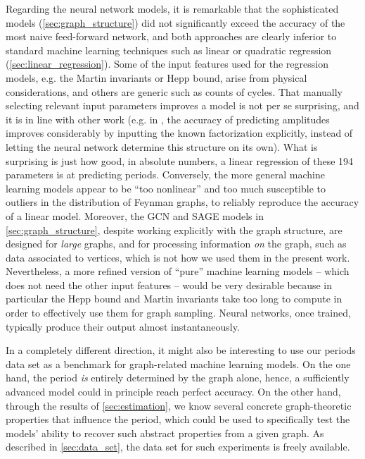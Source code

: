 \documentclass[11pt]{scrartcl}
\numberwithin{equation}{section}
\begin{document}
Regarding the neural network models, it is remarkable that the sophisticated  models (\cref{sec:graph_structure})  did not significantly exceed the accuracy of the most naive feed-forward network, and both approaches are clearly inferior to standard machine learning techniques such as linear or quadratic regression (\cref{sec:linear_regression}). Some of the input features used for the regression models, e.g. the Martin invariants or Hepp bound, arise from physical considerations, and others are generic such as counts of cycles. 
That manually selecting relevant input parameters improves a model is not per se surprising, and it is in line with other work (e.g. in \cite{maitre_oneloop_2023}, the accuracy of predicting amplitudes improves considerably by inputting the known factorization  explicitly, instead of letting the neural network determine this structure on its own). What is surprising is just how good, in absolute numbers, a linear regression of these 194  parameters is at predicting periods. Conversely, the more general machine learning models appear to be \enquote{too nonlinear} and too much susceptible to outliers in the distribution of Feynman graphs, to reliably reproduce the accuracy of a linear model. Moreover, the GCN and SAGE models in \cref{sec:graph_structure}, despite working explicitly with the graph structure, are designed for \emph{large} graphs, and for processing information \emph{on} the graph, such as data associated to vertices, which is not how we used them in the present work. Nevertheless, a more refined version of \enquote{pure} machine learning models -- which does not need the other input features -- would be very desirable because in particular the Hepp bound and Martin invariants take too long to compute in order to effectively use them for graph sampling. Neural networks, once trained, typically produce their output almost instantaneously. 



In a completely different direction,  it might also be interesting to use our periods data set as a benchmark for  graph-related machine learning models. On the one hand, the period \emph{is} entirely determined by the graph alone, hence, a sufficiently advanced model could in principle reach perfect accuracy. On the other hand, through the results of \cref{sec:estimation}, we know several concrete graph-theoretic properties that influence the period, which could be used to specifically test the models' ability to recover such abstract properties from a given graph. As described in \cref{sec:data_set}, the data set for such experiments is freely available. 
\end{document}

